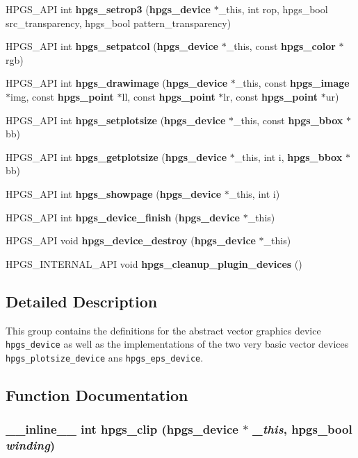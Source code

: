 \begin{CompactItemize}
HPGS\_\-API int {\bf hpgs\_\-setrop3} ({\bf hpgs\_\-device} $\ast$\_\-this, int rop, hpgs\_\-bool src\_\-transparency, hpgs\_\-bool pattern\_\-transparency)
\item 
HPGS\_\-API int {\bf hpgs\_\-setpatcol} ({\bf hpgs\_\-device} $\ast$\_\-this, const {\bf hpgs\_\-color} $\ast$rgb)
\item 
HPGS\_\-API int {\bf hpgs\_\-drawimage} ({\bf hpgs\_\-device} $\ast$\_\-this, const {\bf hpgs\_\-image} $\ast$img, const {\bf hpgs\_\-point} $\ast$ll, const {\bf hpgs\_\-point} $\ast$lr, const {\bf hpgs\_\-point} $\ast$ur)
\item 
HPGS\_\-API int {\bf hpgs\_\-setplotsize} ({\bf hpgs\_\-device} $\ast$\_\-this, const {\bf hpgs\_\-bbox} $\ast$bb)
\item 
HPGS\_\-API int {\bf hpgs\_\-getplotsize} ({\bf hpgs\_\-device} $\ast$\_\-this, int i, {\bf hpgs\_\-bbox} $\ast$bb)
\item 
HPGS\_\-API int {\bf hpgs\_\-showpage} ({\bf hpgs\_\-device} $\ast$\_\-this, int i)
\item 
HPGS\_\-API int {\bf hpgs\_\-device\_\-finish} ({\bf hpgs\_\-device} $\ast$\_\-this)
\item 
HPGS\_\-API void {\bf hpgs\_\-device\_\-destroy} ({\bf hpgs\_\-device} $\ast$\_\-this)
\item 
HPGS\_\-INTERNAL\_\-API void \textbf{hpgs\_\-cleanup\_\-plugin\_\-devices} ()\label{group__device_ge99c6a46a83f5dc00f3e9cc3420356fb}

\end{CompactItemize}


\subsection{Detailed Description}
This group contains the definitions for the abstract vector graphics device {\tt hpgs\_\-device} as well as the implementations of the two very basic vector devices {\tt hpgs\_\-plotsize\_\-device} ans {\tt hpgs\_\-eps\_\-device}. 

\subsection{Function Documentation}
\subsubsection[hpgs\_\-clip]{\setlength{\rightskip}{0pt plus 5cm}\_\-\_\-inline\_\-\_\- int hpgs\_\-clip ({\bf hpgs\_\-device} $\ast$ {\em \_\-this}, \/  hpgs\_\-bool {\em winding})\hspace{0.3cm}{\tt  [static]}}\label{group__device_g65f0a50bdae77921c1a2240d50e8fe31}


